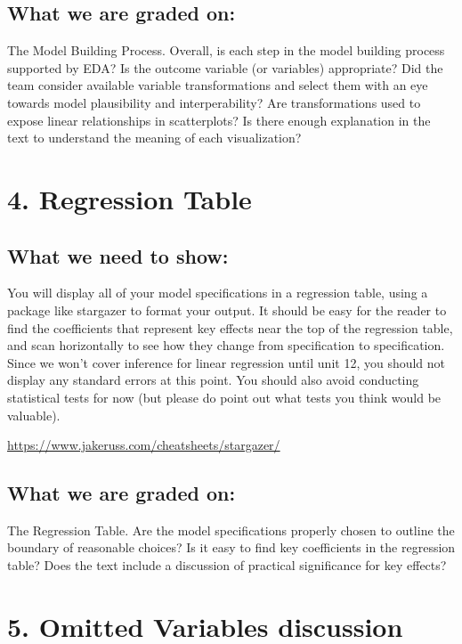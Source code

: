 \documentclass[]{article}
\begin{document}
\subsection{What we are graded on:}\label{what-we-are-graded-on-2}

The Model Building Process. Overall, is each step in the model building
process supported by EDA? Is the outcome variable (or variables)
appropriate? Did the team consider available variable transformations
and select them with an eye towards model plausibility and
interperability? Are transformations used to expose linear relationships
in scatterplots? Is there enough explanation in the text to understand
the meaning of each visualization?

\section{4. Regression Table}\label{regression-table}

\subsection{What we need to show:}\label{what-we-need-to-show}

You will display all of your model specifications in a regression table,
using a package like stargazer to format your output. It should be easy
for the reader to find the coefficients that represent key effects near
the top of the regression table, and scan horizontally to see how they
change from specification to specification. Since we won't cover
inference for linear regression until unit 12, you should not display
any standard errors at this point. You should also avoid conducting
statistical tests for now (but please do point out what tests you think
would be valuable).

\url{https://www.jakeruss.com/cheatsheets/stargazer/}

\subsection{What we are graded on:}\label{what-we-are-graded-on-3}

The Regression Table. Are the model specifications properly chosen to
outline the boundary of reasonable choices? Is it easy to find key
coefficients in the regression table? Does the text include a discussion
of practical significance for key effects?

\section{5. Omitted Variables
discussion}\label{omitted-variables-discussion}
\end{document}

